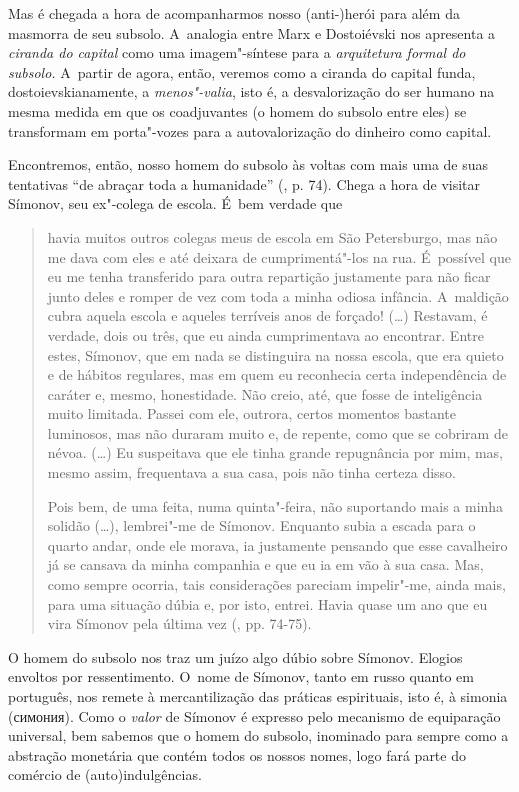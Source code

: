 Mas é chegada a hora de acompanharmos nosso \mbox{(anti-)herói} para além da
masmorra de seu subsolo. A~analogia entre Marx e Dostoiévski nos
apresenta a \emph{ciranda do capital} como uma imagem"-síntese para a
\emph{arquitetura formal do subsolo.} A~partir de agora, então, veremos
como a ciranda do capital funda, dostoievskianamente, a
\emph{menos"-valia}, isto é, a desvalorização do ser humano na mesma
medida em que os coadjuvantes (o homem do subsolo entre eles) se
transformam em porta"-vozes para a autovalorização do dinheiro como
capital.

Encontremos, então, nosso homem do subsolo às voltas com mais uma de
suas tentativas ``de abraçar toda a humanidade'' (, p. 74). Chega a
hora de visitar Símonov, seu ex"-colega de escola. É~bem verdade que

\begin{quote}
havia muitos outros colegas meus de escola em São Petersburgo, mas não
me dava com eles e até deixara de cumprimentá"-los na rua. É~possível que
eu me tenha transferido para outra repartição justamente para não ficar
junto deles e romper de vez com toda a minha odiosa infância. A~maldição
cubra aquela escola e aqueles terríveis anos de forçado! (\ldots) Restavam,
é verdade, dois ou três, que eu ainda cumprimentava ao encontrar. Entre
estes, Símonov, que em nada se distinguira na nossa escola, que era
quieto e de hábitos regulares, mas em quem eu reconhecia certa
independência de caráter e, mesmo, honestidade. Não creio, até, que
fosse de inteligência muito limitada. Passei com ele, outrora, certos
momentos bastante luminosos, mas não duraram muito e, de repente, como
que se cobriram de névoa. (\ldots) Eu suspeitava que ele tinha grande
repugnância por mim, mas, mesmo assim, frequentava a sua casa, pois não
tinha certeza disso.

\noindent Pois bem, de uma feita, numa quinta"-feira, não suportando mais a minha
solidão (\ldots), lembrei"-me de Símonov. Enquanto subia a escada para o
quarto andar, onde ele morava, ia justamente pensando que esse
cavalheiro já se cansava da minha companhia e que eu ia em vão à sua
casa. Mas, como sempre ocorria, tais considerações pareciam impelir"-me,
ainda mais, para uma situação dúbia e, por isto, entrei. Havia quase um
ano que eu vira Símonov pela última vez (, pp. 74-75).
\end{quote}

O homem do subsolo nos traz um juízo algo dúbio sobre Símonov. Elogios
envoltos por ressentimento. O~nome de Símonov, tanto em russo quanto em
português, nos remete à mercantilização das práticas espirituais, isto
é, à simonia
(симония). Como o
\emph{valor} de Símonov é expresso pelo mecanismo de equiparação
universal, bem sabemos que o homem do subsolo, inominado para sempre
como a abstração monetária que contém todos os nossos nomes, logo fará
parte do comércio de (auto)indulgências.

